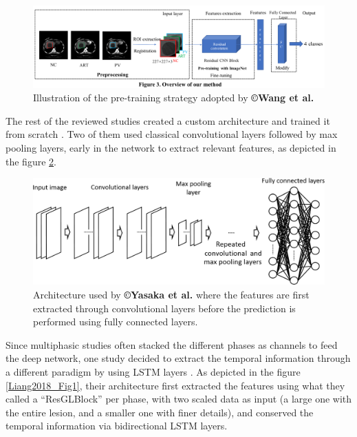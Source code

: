 \begin{figure}[th!]
\centering
\includegraphics[width=0.9\linewidth]{images/image6}
\caption{Illustration of the pre-training strategy adopted by \textbf{©Wang et al.} \cite{Wang2018}}
\label{Wang2018_Fig3}
\end{figure}


The rest of the reviewed studies created a custom architecture and
trained it from scratch \cite{Yasaka2018a,Yasaka2018,Liang2018}.
Two of them used classical convolutional layers followed by max pooling
layers, early in the network to extract relevant features, as depicted
in the figure \ref{Yasaka2018_Fig2}.

\begin{figure}[th!]
\centering
\includegraphics[width=0.7\linewidth]{images/yasaka2018}
\caption{Architecture used by \textbf{©Yasaka et al.} where the features are first extracted through convolutional layers before the prediction is performed using fully connected layers. \cite{Yasaka2018}}
\label{Yasaka2018_Fig2}
\end{figure}

Since multiphasic studies often stacked the different phases as channels
to feed the deep network, one study decided to extract the temporal
information through a different paradigm by using LSTM layers \cite{Liang2018}. As depicted
in the figure \ref{Liang2018_Fig1}, their architecture first extracted the features using what they
called a ``ResGLBlock'' per phase, with two scaled data as input (a
large one with the entire lesion, and a smaller one with finer details),
and conserved the temporal information via bidirectional LSTM
layers.

